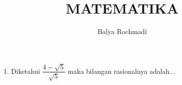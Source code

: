 \documentclass[12pt,a4paper]{exam}
\author{Balya Rochmadi}
\title{MATEMATIKA}
\begin{document}
	\begin{enumerate}
		\item Diketahui $\dfrac{4-\sqrt{5}}{\sqrt{5}}$ maka bilangan rasionalnya adalah...
		 \begin{choices}
			\item $ $
		\end{choices} 
	\end{enumerate}
\end{document}
